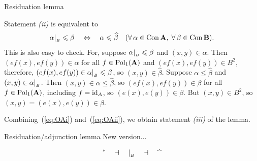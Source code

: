 \begin{frame}[fragile,label=P5Lemma]{Residuation lemma}
{{Statement {\it (ii)} is equivalent to 
  \begin{equation}
    \label{eq:OAii}
    \alpha|_{_B}\leqslant \beta 
    \quad \Leftrightarrow \quad 
    \alpha \leqslant \widehat{\beta}
    \quad (\forall \, \alpha \in \mathrm{Con\,}\mathbf{A},\; \forall \, \beta \in \mathrm{Con\,}\mathbf{B}).
  \end{equation}
  This is also easy to check.  For, suppose
  $\alpha|_{_B}\leqslant \beta$ and $(x,y)\in \alpha$. Then $(ef(x), ef(y)) \in \alpha$
  for all $f \in \mathrm{Pol}_1(\mathbf{A})$ and $(ef(x), ef(y)) \in B^2$, therefore, 
  $(ef(x), ef(y)) \in \alpha|_{_B} \leqslant \beta$, so $(x,y) \in \widehat{\beta}$.
  Suppose $\alpha \leq \widehat{\beta}$ and $(x,y) \in \alpha|_{_B}$. 
  Then $(x,y) \in \alpha \leq  \widehat{\beta}$, so 
  $(ef(x), ef(y)) \in \beta$ for all $f\in \mathrm{Pol}_1(\mathbf{A})$, including $f=\mathrm{id}_A$, so 
  $(e(x), e(y)) \in \beta$. But $(x, y) \in B^2$, so $(x, y) = (e(x), e(y)) \in
  \beta$.

  Combining~(\ref{eq:OAi}) and~(\ref{eq:OAii}), we obtain statement {\it (iii)} of the lemma.}
}
\end{frame}

\begin{frame}[fragile,label=P5Lemma]{Residuation/adjunction lemma}
New version...
\vskip2mm
\begin{lemma} %
\label{lem:residuation-lemma}
{\Large \[^* \quad \dashv \quad \resB \quad \dashv \quad \hatmap\] }
\end{lemma}
\vskip2mm
\end{frame}

